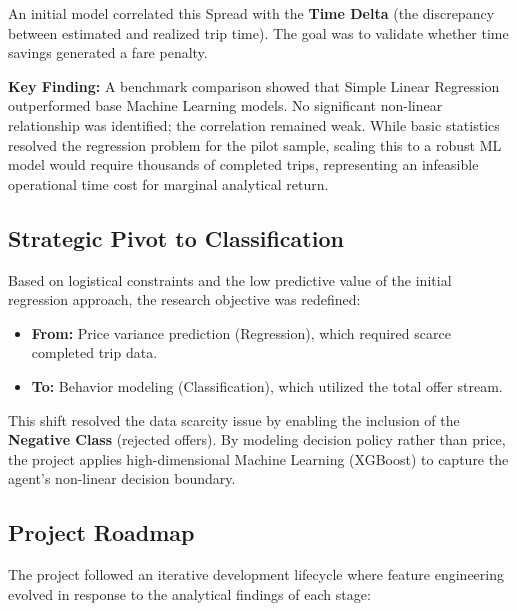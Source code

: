 An initial model correlated this Spread with the \textbf{Time Delta} (the discrepancy between estimated and realized trip time). The goal was to validate whether time savings generated a fare penalty.

\textbf{Key Finding:} A benchmark comparison showed that Simple Linear Regression outperformed base Machine Learning models. No significant non-linear relationship was identified; the correlation remained weak. While basic statistics resolved the regression problem for the pilot sample, scaling this to a robust ML model would require thousands of completed trips, representing an infeasible operational time cost for marginal analytical return.

\subsection{Strategic Pivot to Classification}
Based on logistical constraints and the low predictive value of the initial regression approach, the research objective was redefined:
\begin{itemize}
    \item \textbf{From:} Price variance prediction (Regression), which required scarce completed trip data.
    \item \textbf{To:} Behavior modeling (Classification), which utilized the total offer stream.
\end{itemize}

This shift resolved the data scarcity issue by enabling the inclusion of the \textbf{Negative Class} (rejected offers). By modeling decision policy rather than price, the project applies high-dimensional Machine Learning (XGBoost) to capture the agent's non-linear decision boundary.

\subsection{Project Roadmap}
The project followed an iterative development lifecycle where feature engineering evolved in response to the analytical findings of each stage:

